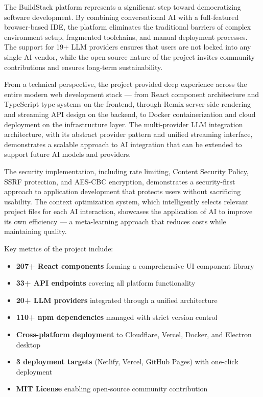 \documentclass[12pt,a4paper,openany]{report}
\begin{document}
The BuildStack platform represents a significant step toward democratizing software development. By combining conversational AI with a full-featured browser-based IDE, the platform eliminates the traditional barriers of complex environment setup, fragmented toolchains, and manual deployment processes. The support for 19+ LLM providers ensures that users are not locked into any single AI vendor, while the open-source nature of the project invites community contributions and ensures long-term sustainability.

From a technical perspective, the project provided deep experience across the entire modern web development stack --- from React component architecture and TypeScript type systems on the frontend, through Remix server-side rendering and streaming API design on the backend, to Docker containerization and cloud deployment on the infrastructure layer. The multi-provider LLM integration architecture, with its abstract provider pattern and unified streaming interface, demonstrates a scalable approach to AI integration that can be extended to support future AI models and providers.

The security implementation, including rate limiting, Content Security Policy, SSRF protection, and AES-CBC encryption, demonstrates a security-first approach to application development that protects users without sacrificing usability. The context optimization system, which intelligently selects relevant project files for each AI interaction, showcases the application of AI to improve its own efficiency --- a meta-learning approach that reduces costs while maintaining quality.

Key metrics of the project include:
\begin{itemize}
    \item \textbf{207+ React components} forming a comprehensive UI component library
    \item \textbf{33+ API endpoints} covering all platform functionality
    \item \textbf{20+ LLM providers} integrated through a unified architecture
    \item \textbf{110+ npm dependencies} managed with strict version control
    \item \textbf{Cross-platform deployment} to Cloudflare, Vercel, Docker, and Electron desktop
    \item \textbf{3 deployment targets} (Netlify, Vercel, GitHub Pages) with one-click deployment
    \item \textbf{MIT License} enabling open-source community contribution
\end{itemize}
\end{document}

